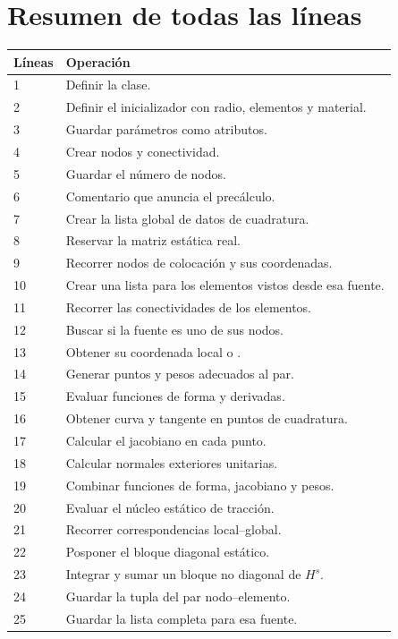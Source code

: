 \documentclass[11pt,a4paper]{article}
\numberwithin{equation}{section}
\DeclareRobustCommand{\code}[1]{\texttt{\detokenize{#1}}}
\begin{document}
\section{Resumen de todas las l\'ineas}
\begin{longtable}{p{}p{}}
\toprule
L\'ineas & Operaci\'on\\
\midrule
\endhead
1 & Definir la clase.\\
2 & Definir el inicializador con radio, elementos y material.\\
3 & Guardar par\'ametros como atributos.\\
4 & Crear nodos y conectividad.\\
5 & Guardar el n\'umero de nodos.\\
6 & Comentario que anuncia el prec\'alculo.\\
7 & Crear la lista global de datos de cuadratura.\\
8 & Reservar la matriz est\'atica real.\\
9 & Recorrer nodos de colocaci\'on y sus coordenadas.\\
10 & Crear una lista para los elementos vistos desde esa fuente.\\
11 & Recorrer las conectividades de los elementos.\\
12 & Buscar si la fuente es uno de sus nodos.\\
13 & Obtener su coordenada local o \code{None}.\\
14 & Generar puntos y pesos adecuados al par.\\
15 & Evaluar funciones de forma y derivadas.\\
16 & Obtener curva y tangente en puntos de cuadratura.\\
17 & Calcular el jacobiano en cada punto.\\
18 & Calcular normales exteriores unitarias.\\
19 & Combinar funciones de forma, jacobiano y pesos.\\
20 & Evaluar el n\'ucleo est\'atico de tracci\'on.\\
21 & Recorrer correspondencias local--global.\\
22 & Posponer el bloque diagonal est\'atico.\\
23 & Integrar y sumar un bloque no diagonal de $H^s$.\\
24 & Guardar la tupla del par nodo--elemento.\\
25 & Guardar la lista completa para esa fuente.\\

\end{longtable}
\end{document}
